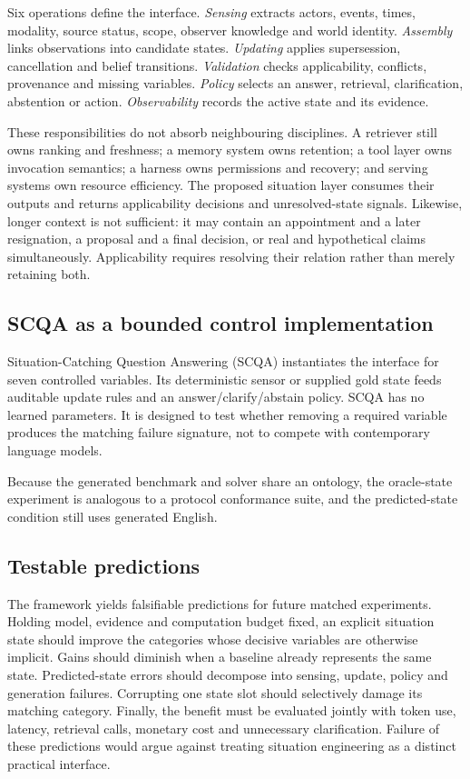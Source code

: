 Six operations define the interface. \emph{Sensing} extracts actors, events,
times, modality, source status, scope, observer knowledge and world identity.
\emph{Assembly} links observations into candidate states. \emph{Updating}
applies supersession, cancellation and belief transitions. \emph{Validation}
checks applicability, conflicts, provenance and missing variables.
\emph{Policy} selects an answer, retrieval, clarification, abstention or action.
\emph{Observability} records the active state and its evidence.

These responsibilities do not absorb neighbouring disciplines. A retriever
still owns ranking and freshness; a memory system owns retention; a tool layer
owns invocation semantics; a harness owns permissions and recovery; and serving
systems own resource efficiency. The proposed situation layer consumes their
outputs and returns applicability decisions and unresolved-state signals.
Likewise, longer context is not sufficient: it may contain an appointment and
a later resignation, a proposal and a final decision, or real and hypothetical
claims simultaneously. Applicability requires resolving their relation rather
than merely retaining both.

\subsection*{SCQA as a bounded control implementation}

Situation-Catching Question Answering (SCQA) instantiates the interface for
seven controlled variables. Its deterministic sensor or supplied gold state
feeds auditable update rules and an answer/clarify/abstain policy. SCQA has no
learned parameters. It is designed to test whether removing a required variable
produces the matching failure signature, not to compete with contemporary
language models.

Because the generated benchmark and solver share an ontology, the oracle-state
experiment is analogous to a protocol conformance suite, and the predicted-state
condition still uses generated English.

\subsection*{Testable predictions}

The framework yields falsifiable predictions for future matched experiments.
Holding model, evidence and computation budget fixed, an explicit situation
state should improve the categories whose decisive variables are otherwise
implicit. Gains should diminish when a baseline already represents the same
state. Predicted-state errors should decompose into sensing, update, policy and
generation failures. Corrupting one state slot should selectively damage its
matching category. Finally, the benefit must be evaluated jointly with token
use, latency, retrieval calls, monetary cost and unnecessary clarification.
Failure of these predictions would argue against treating situation engineering
as a distinct practical interface.
